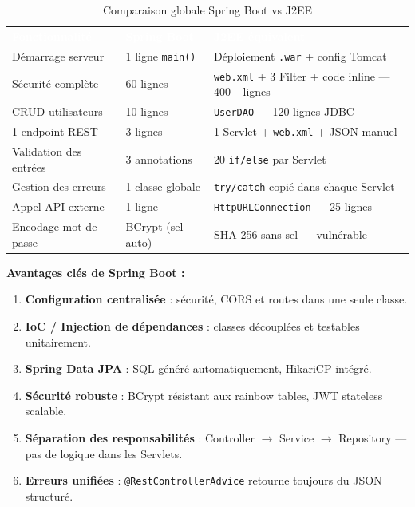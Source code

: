 \documentclass[11pt,a4paper]{article}
\newcommand{\code}[1]{\texttt{\small #1}}
\newcommand{\theadrowT}[3]{%
  \rowcolor{headerbg}\textcolor{white}{\textbf{#1}} & \textcolor{white}{\textbf{#2}} & \textcolor{white}{\textbf{#3}}\\}
\begin{document}
\begin{table}[h!]
\centering
\renewcommand{\arraystretch}{1.4}
\begin{tabularx}{\linewidth}{L{5.5cm} L{2.8cm} X}
\theadrowT{Fonctionnalité}{Spring Boot}{J2EE équivalent}
Démarrage serveur              & 1 ligne \code{main()} & Déploiement \code{.war} + config Tomcat \\
Sécurité complète              & 60 lignes             & \code{web.xml} + 3 Filter + code inline — 400+ lignes \\
CRUD utilisateurs              & 10 lignes             & \code{UserDAO} — 120 lignes JDBC \\
1 endpoint REST                & 3 lignes              & 1 Servlet + \code{web.xml} + JSON manuel \\
Validation des entrées         & 3 annotations         & 20 \code{if/else} par Servlet \\
Gestion des erreurs            & 1 classe globale      & \code{try/catch} copié dans chaque Servlet \\
Appel API externe              & 1 ligne               & \code{HttpURLConnection} — 25 lignes \\
Encodage mot de passe          & BCrypt (sel auto)     & SHA-256 sans sel — vulnérable \\
\bottomrule
\end{tabularx}
\caption{Comparaison globale Spring Boot vs J2EE}
\end{table}

\vspace{8pt}
\noindent\textbf{Avantages clés de Spring Boot :}
\begin{enumerate}[leftmargin=*, itemsep=2pt]
  \item \textbf{Configuration centralisée} : sécurité, CORS et routes dans une seule classe.
  \item \textbf{IoC / Injection de dépendances} : classes découplées et testables unitairement.
  \item \textbf{Spring Data JPA} : SQL généré automatiquement, HikariCP intégré.
  \item \textbf{Sécurité robuste} : BCrypt résistant aux rainbow tables, JWT stateless scalable.
  \item \textbf{Séparation des responsabilités} : Controller $\to$ Service $\to$ Repository — pas de logique dans les Servlets.
  \item \textbf{Erreurs unifiées} : \code{@RestControllerAdvice} retourne toujours du JSON structuré.
\end{enumerate}
\end{document}

